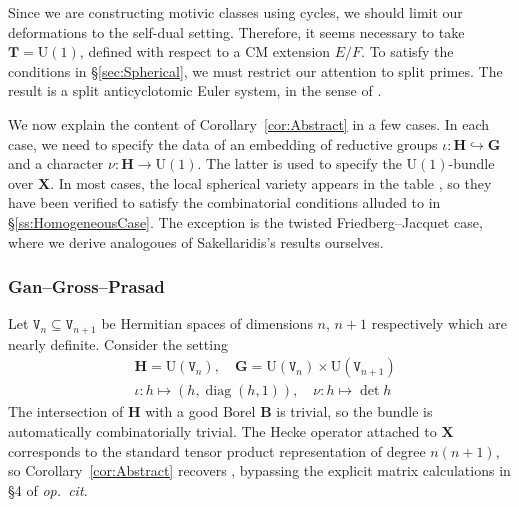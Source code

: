 \documentclass{amsart}
\theoremstyle{definition}
\theoremstyle{remark}
\newcommand{\1}{\mathbf{1}}
\newcommand{\mb}[1]{\mathbf{#1}}
\newcommand{\U}{\mathrm{U}}
\DeclareMathOperator{\diag}{diag}
\theoremstyle{definition}
\newcommand{\bH}{\mathbf{H}}
\newcommand{\bG}{\mathbf{G}}
\begin{document}
Since we are constructing motivic classes using cycles, we should limit our deformations to the self-dual setting. Therefore, it seems necessary to take $\mb{T}=\U(1)$, defined with respect to a CM extension $E/F$. To satisfy the conditions in \S\ref{sec:Spherical}, we must restrict our attention to split primes. The result is a split anticyclotomic Euler system, in the sense of \cite{JNS}.

We now explain the content of Corollary~\ref{cor:Abstract} in a few cases. In each case, we need to specify the data of an embedding of reductive groups $\iota:\mb{H}\hookrightarrow\mb{G}$ and a character $\nu:\mb{H}\to\U(1)$. The latter is used to specify the $\U(1)$-bundle over $\mb{X}$. In most cases, the local spherical variety appears in the table \cite[Appendix A]{SakSpherical}, so they have been verified to satisfy the combinatorial conditions alluded to in \S\ref{ss:HomogeneousCase}. The exception is the twisted Friedberg--Jacquet case, where we derive analogoues of Sakellaridis's results ourselves.

\subsubsection{Gan--Gross--Prasad \cite{LaiSkinner}}
Let $\mathtt{V}_{n}\subseteq\mathtt{V}_{n+1}$ be Hermitian spaces of dimensions $n$, $n+1$ respectively which are nearly definite. Consider the setting
\begin{align*}
  &\mb{H}=\U(\mathtt{V}_n),\quad\bG=\U(\mathtt{V}_n)\times\U(\mathtt{V}_{n+1})\\
  &\iota:h\mapsto (h,\diag(h,1)),\quad \nu:h\mapsto\det h
\end{align*}
The intersection of $\bH$ with a good Borel $\mb{B}$ is trivial, so the bundle is automatically combinatorially trivial. The Hecke operator attached to $\mb{X}$ corresponds to the standard tensor product representation of degree $n(n+1)$, so Corollary~\ref{cor:Abstract} recovers \cite[Proposition 5.4]{LaiSkinner}, bypassing the explicit matrix calculations in \S 4 of \emph{op.~cit.}
\end{document}
